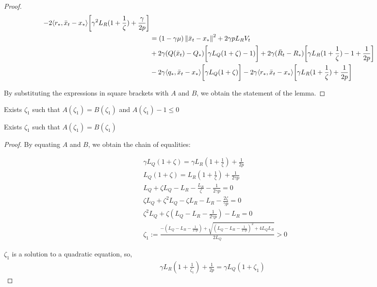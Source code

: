\begin{proof}
\begin{align}
\begin{split}
            - 2\langle r_*, \bar{x}_t - x_*\rangle\biggr[ \gamma^2 L_R(1+\frac{1}{\zeta}) + \frac{\gamma}{2p} \biggr] \\
            &= (1 - \gamma \mu)\left\|\bar{x}_t - x_*\right\|^2 + 2 \gamma p L_R V_t \\
            &+ 2\gamma (Q(\bar{x}_t) - Q_*)\biggr[ \gamma L_Q (1+\zeta) - 1) \biggr] 
            + 2\gamma (\bar{R}_t - R_*)\biggr[ \gamma L_R (1+\frac{1}{\zeta}) - 1 + \frac{1}{2p} \biggr] \\
            &- 2\gamma \langle q_*, \bar{x}_t - x_*\rangle\biggr[ \gamma L_Q(1+\zeta)  \biggr]
            - 2\gamma \langle r_*, \bar{x}_t - x_*\rangle\biggr[ \gamma L_R(1+\frac{1}{\zeta}) + \frac{1}{2p} \biggr]
        \end{split}
    \end{align}
        
By substituting the expressions in square brackets with $A$ and $B$, we obtain the statement of the lemma.
\end{proof}

\begin{lemma}\label{lem:Technical}
    Exists $\zeta_1$ such that $A(\zeta_1) = B(\zeta_1)$ and $A(\zeta_1) - 1 \leq 0$
\end{lemma}
\begin{sublemma}\label{sublem:sublemma_1}
    Exists $\zeta_1$ such that $A(\zeta_1) = B(\zeta_1)$
\end{sublemma}
\begin{proof}
    By equating $A$ and $B$, we obtain the chain of equalities:

    \begin{align}
        &\gamma L_Q(1+\zeta)= \gamma L_R(1+\frac{1}{\zeta}) + \frac{1}{2p} \\
        &L_Q(1+\zeta) = L_R(1+\frac{1}{\zeta}) + \frac{1}{2\gamma p} \\
        &L_Q + \zeta L_Q - L_R - \frac{L_R}{\zeta} - \frac{1}{2\gamma p} = 0 \\
        &\zeta L_Q + \zeta^2 L_Q - \zeta L_R - L_R - \frac{2\zeta}{\gamma p} = 0\\
        &\zeta^2 L_Q + \zeta (L_Q - L_R - \frac{1}{2\gamma p}) - L_R = 0 \\
        &\zeta_{1} := \frac{-(L_Q - L_R - \frac{1}{2\gamma p}) + \sqrt{(L_Q - L_R - \frac{1}{2\gamma p})^2 + 4 L_Q L_R}}{2L_Q} > 0
    \end{align}
    
    $\zeta_{1}$ is a solution to a quadratic equation, so,
    \begin{align}
        \gamma L_R (1+\frac{1}{\zeta_1}) + \frac{1}{2p} = \gamma L_Q (1+\zeta_1) \label{eq:St_5}
    \end{align}
\end{proof}


